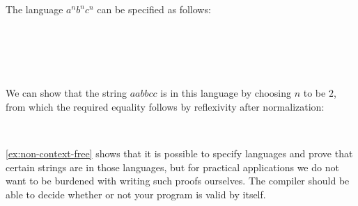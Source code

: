 \begin{example}\label{ex:non-context-free}
The language $a^n b^n c^n$ can be specified as follows:
\begin{code}[hide]%
%
\>[4]\AgdaSpace{}%
\AgdaSymbol{:}\AgdaSpace{}%
\AgdaSpace{}%
\AgdaSpace{}%
\AgdaSpace{}%
\AgdaSpace{}%
\<%
\\
%
\>[4]\AgdaSpace{}%
\AgdaSpace{}%
\AgdaSymbol{\AgdaUnderscore{}}\AgdaSpace{}%
\AgdaSymbol{=}\AgdaSpace{}%
\AgdaInductiveConstructor{[]}\<%
\\
%
\>[4]\AgdaSpace{}%
\AgdaSymbol{(}\AgdaSpace{}%
\AgdaSymbol{)}\AgdaSpace{}%
\AgdaSpace{}%
\AgdaSymbol{=}\AgdaSpace{}%
\AgdaSpace{}%
\AgdaSpace{}%
\AgdaSpace{}%
\AgdaSpace{}%
\<%
\end{code}
\begin{code}%
%
\>[4]\AgdaSpace{}%
\AgdaSymbol{:}\AgdaSpace{}%
\<%
\\
%
\>[4]\AgdaSpace{}%
\AgdaSpace{}%
\AgdaSymbol{=}\AgdaSpace{}%
\AgdaFunction{Σ[}\AgdaSpace{}%
\AgdaSpace{}%
\AgdaSpace{}%
\AgdaSpace{}%
\AgdaFunction{]}\AgdaSpace{}%
\AgdaSpace{}%
\AgdaSpace{}%
\AgdaSpace{}%
\AgdaSpace{}%
\AgdaSpace{}%
\AgdaOperator{\AgdaFunction{++}}\AgdaSpace{}%
\AgdaSpace{}%
\AgdaSpace{}%
\AgdaSpace{}%
\AgdaOperator{\AgdaFunction{++}}\AgdaSpace{}%
\AgdaSpace{}%
\AgdaSpace{}%
\<%
\end{code}
We can show that the string $aabbcc$ is in this language by choosing $n$ to be $2$, from which the required equality follows by reflexivity after normalization:
\begin{code}%
%
\>[4]\AgdaSpace{}%
\AgdaSymbol{:}\AgdaSpace{}%
\AgdaSpace{}%
\<%
\\
%
\>[4]\AgdaSpace{}%
\AgdaSymbol{=}\AgdaSpace{}%
\AgdaSpace{}%
\AgdaOperator{\AgdaInductiveConstructor{,}}\AgdaSpace{}%
\<%
\end{code}
\end{example}
\cref{ex:non-context-free} shows that it is possible to specify languages and prove that certain strings are in those languages, but for practical applications we do not want to be burdened with writing such proofs ourselves. The compiler should be able to decide whether or not your program is valid by itself.

